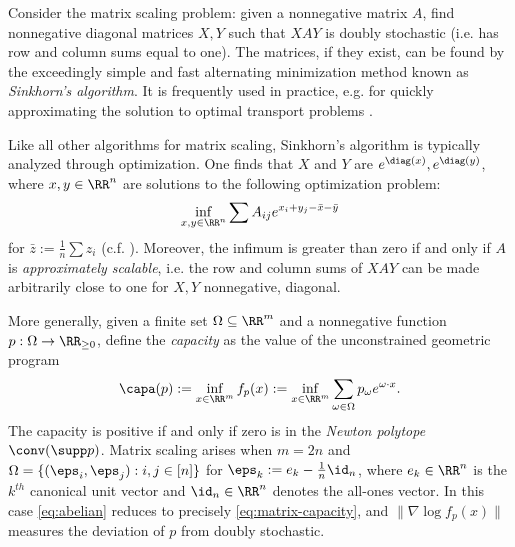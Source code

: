 Consider the matrix scaling problem: given a nonnegative matrix $A$, find nonnegative diagonal matrices $X, Y$ such that $XA Y$ is doubly stochastic (i.e. has row and column sums equal to one). The matrices, if they exist, can be found by the exceedingly simple and fast alternating minimization method known as \emph{Sinkhorn's algorithm}. It is frequently used in practice, e.g. for quickly approximating the solution to optimal transport problems \cite{cuturi2013sinkhorn}.

Like all other algorithms for matrix scaling,  Sinkhorn's algorithm is typically analyzed through optimization. One finds that $X$ and $Y$ are $e^{\diag(x)}, e^{\diag(y)}$, where $x,y \in \RR^n$ are solutions to the following optimization problem: 
\begin{align}\inf_{x, y \in \RR^n} \sum A_{ij}e^{x_i + y_j - \bar{x} - \bar{y}}\label{eq:matrix-capacity}\end{align}
for $\bar{z}:=\frac{1}{n} \sum z_i$ (c.f. \cite{kalantari1996complexity}). Moreover, the infimum is greater than zero if and only if $A$ is \emph{approximately scalable}, i.e. the row and column sums of $XAY$ can be made arbitrarily close to one for $X, Y$ nonnegative, diagonal.


More generally, given a finite set $\Omega \subseteq \RR^m$ and a nonnegative function $p:\Omega \to \RR_{\geq 0}$, define the \emph{capacity} \cite{gurvits2004combinatorial} as the value of the unconstrained geometric program
\begin{gather}
\capa(p):= \inf_{x \in \RR^m} f_p(x) := \inf_{x \in \RR^m} \sum_{\omega \in \Omega} p_\omega e^{\omega \cdot x}.\label{eq:abelian}
\end{gather}
The capacity is positive if and only if zero is in the \emph{Newton polytope} $\conv(\supp p)$. Matrix scaling arises when $m = 2n$ and $\Omega = \{(\eps_i, \eps_j): i,j \in [n]\}$ for $\eps_k:=e_k - \frac{1}{n} \id_n$, where $e_k \in \RR^n$ is the $k^{th}$ canonical unit vector and $\id_n \in \RR^n$ denotes the all-ones vector. In this case \cref{eq:abelian} reduces to precisely \cref{eq:matrix-capacity}, and $\|\nabla \log f_p (x)\|$ measures the deviation of $p$ from doubly stochastic.

